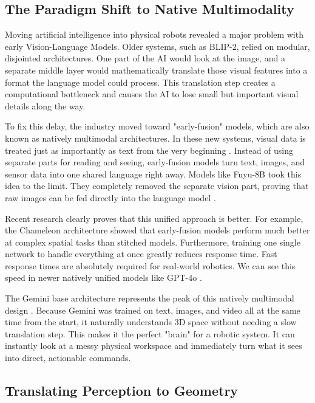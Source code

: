 \documentclass[a4paper, 12pt, twoside, openright]{book}
\begin{document}
\subsection{The Paradigm Shift to Native Multimodality}

Moving artificial intelligence into physical robots revealed a major problem with early Vision-Language Models. Older systems, such as BLIP-2, relied on modular, disjointed architectures. One part of the AI would look at the image, and a separate middle layer would mathematically translate those visual features into a format the language model could process. This translation step creates a computational bottleneck and causes the AI to lose small but important visual details along the way.

To fix this delay, the industry moved toward "early-fusion" models, which are also known as natively multimodal architectures. In these new systems, visual data is treated just as importantly as text from the very beginning \cite{huang2023language}. Instead of using separate parts for reading and seeing, early-fusion models turn text, images, and sensor data into one shared language right away. Models like Fuyu-8B took this idea to the limit. They completely removed the separate vision part, proving that raw images can be fed directly into the language model \cite{bavishi2023fuyu}.

Recent research clearly proves that this unified approach is better. For example, the Chameleon architecture \cite{chameleon2024team} showed that early-fusion models perform much better at complex spatial tasks than stitched models. Furthermore, training one single network to handle everything at once greatly reduces response time. Fast response times are absolutely required for real-world robotics. We can see this speed in newer natively unified models like GPT-4o \cite{openai2024gpt4o}.

The Gemini base architecture represents the peak of this natively multimodal design \cite{gemini2023team}. Because Gemini was trained on text, images, and video all at the same time from the start, it naturally understands 3D space without needing a slow translation step. This makes it the perfect "brain" for a robotic system. It can instantly look at a messy physical workspace and immediately turn what it sees into direct, actionable commands.


\subsection{Translating Perception to Geometry}
\end{document}
